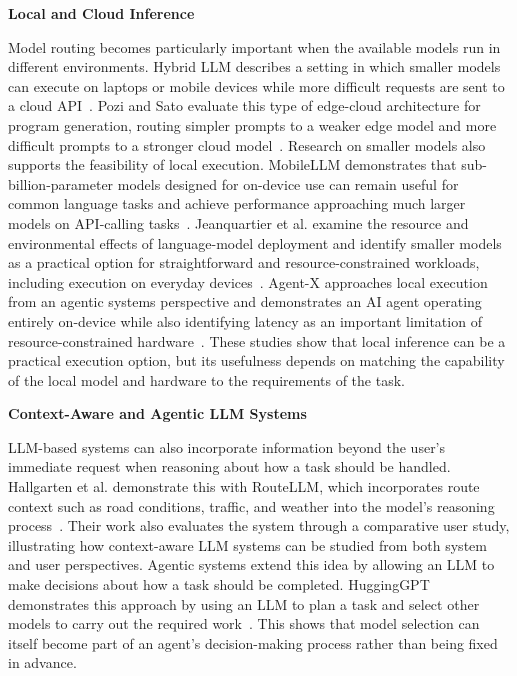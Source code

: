 \documentclass[sigconf,nonacm]{acmart}
\begin{document}
\noindent\textbf{Local and Cloud Inference}\par
\noindent Model routing becomes particularly important when the available models run in different environments. Hybrid LLM describes a setting in which smaller models can execute on laptops or mobile devices while more difficult requests are sent to a cloud API~\cite{ding2024hybridllm}. Pozi and Sato evaluate this type of edge-cloud architecture for program generation, routing simpler prompts to a weaker edge model and more difficult prompts to a stronger cloud model~\cite{pozi2025routing}. Research on smaller models also supports the feasibility of local execution. MobileLLM demonstrates that sub-billion-parameter models designed for on-device use can remain useful for common language tasks and achieve performance approaching much larger models on API-calling tasks~\cite{liu2024mobilellm}. Jeanquartier et al. examine the resource and environmental effects of language-model deployment and identify smaller models as a practical option for straightforward and resource-constrained workloads, including execution on everyday devices~\cite{jeanquartier2026carbon}. Agent-X approaches local execution from an agentic systems perspective and demonstrates an AI agent operating entirely on-device while also identifying latency as an important limitation of resource-constrained hardware~\cite{chung2026agentx}. These studies show that local inference can be a practical execution option, but its usefulness depends on matching the capability of the local model and hardware to the requirements of the task.

\noindent\textbf{Context-Aware and Agentic LLM Systems}\par
\noindent LLM-based systems can also incorporate information beyond the user's immediate request when reasoning about how a task should be handled. Hallgarten et al. demonstrate this with RouteLLM, which incorporates route context such as road conditions, traffic, and weather into the model's reasoning process~\cite{hallgarten2025routllm}. Their work also evaluates the system through a comparative user study, illustrating how context-aware LLM systems can be studied from both system and user perspectives. Agentic systems extend this idea by allowing an LLM to make decisions about how a task should be completed. HuggingGPT demonstrates this approach by using an LLM to plan a task and select other models to carry out the required work~\cite{shen2023hugginggpt}. This shows that model selection can itself become part of an agent's decision-making process rather than being fixed in advance. 
\end{document}
